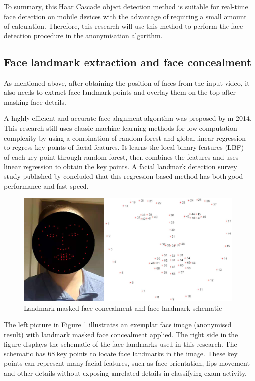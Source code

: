 To summary, this Haar Cascade object detection method is suitable for real-time face detection on mobile devices with the advantage of requiring a small amount of calculation. 
Therefore, this research will use this method to perform the face detection procedure in the anonymisation algorithm.

\subsection{Face landmark extraction and face concealment} %
As mentioned above, after obtaining the position of faces from the input video, it also needs to extract face landmark points and overlay them on the top after masking face details.

A highly efficient and accurate face alignment algorithm was proposed by \citet{ren2014face} in 2014.
This research still uses classic machine learning methods for low computation complexity by using a combination of random forest and global linear regression to regress key points of facial features.
It learns the local binary features (LBF) of each key point through random forest, then combines the features and uses linear regression to obtain the key points.
A facial landmark detection survey study published by \citet{wu2019facial} concluded that this regression-based method has both good performance and fast speed.

\begin{figure}[!ht]
    \centering
    \includegraphics[width=\textwidth]{design/imgs/3-face-landmark.png}
    \caption{Landmark masked face concealment and face landmark schematic}
    \label{fig:3-face-landmark}
\end{figure}

The left picture in Figure \ref{fig:3-face-landmark} illustrates an exemplar face image (anonymised result) with landmark masked face concealment applied.
The right side in the figure displays the schematic of the face landmarks used in this research.
The schematic has 68 key points to locate face landmarks in the image.
These key points can represent many facial features, such as face orientation, lips movement and other details without exposing unrelated details in classifying exam activity.

